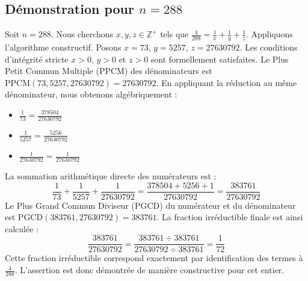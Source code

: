 \documentclass[11pt,a4paper]{article}
\begin{document}
\subsection{Démonstration pour $n = 288$}
Soit $n = 288$. Nous cherchons $x, y, z \in \mathbb{Z}^{+}$ tels que $\frac{4}{288} = \frac{1}{x} + \frac{1}{y} + \frac{1}{z}$.
Appliquons l'algorithme constructif. Posons $x = 73$, $y = 5257$, $z = 27630792$.
Les conditions d'intégrité stricte $x > 0$, $y > 0$ et $z > 0$ sont formellement satisfaites.
Le Plus Petit Commun Multiple (PPCM) des dénominateurs est $\text{PPCM}(73, 5257, 27630792) = 27630792$.
En appliquant la réduction au même dénominateur, nous obtenons algébriquement :
\begin{itemize}
    \item $\frac{1}{73} = \frac{378504}{27630792}$
    \item $\frac{1}{5257} = \frac{5256}{27630792}$
    \item $\frac{1}{27630792} = \frac{1}{27630792}$
\end{itemize}
La sommation arithmétique directe des numérateurs est :
$$ \frac{1}{73} + \frac{1}{5257} + \frac{1}{27630792} = \frac{378504 + 5256 + 1}{27630792} = \frac{383761}{27630792} $$
Le Plus Grand Commun Diviseur (PGCD) du numérateur et du dénominateur est $\text{PGCD}(383761, 27630792) = 383761$.
La fraction irréductible finale est ainsi calculée :
$$ \frac{383761}{27630792} = \frac{383761 \div 383761}{27630792 \div 383761} = \frac{1}{72} $$
Cette fraction irréductible correspond exactement par identification des termes à $\frac{4}{288}$. L'assertion est donc démontrée de manière constructive pour cet entier.
\end{document}
